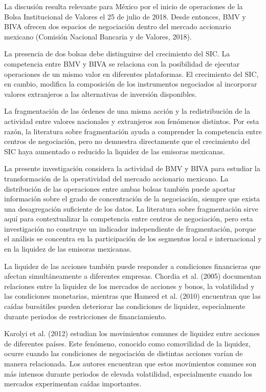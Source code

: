 La discusión resulta relevante para México por el inicio de operaciones de la Bolsa Institucional de Valores el 25 de julio de 2018. Desde entonces, BMV y BIVA ofrecen dos espacios de negociación dentro del mercado accionario mexicano (Comisión Nacional Bancaria y de Valores, 2018).

La presencia de dos bolsas debe distinguirse del crecimiento del SIC. La competencia entre BMV y BIVA se relaciona con la posibilidad de ejecutar operaciones de un mismo valor en diferentes plataformas. El crecimiento del SIC, en cambio, modifica la composición de los instrumentos negociados al incorporar valores extranjeros a las alternativas de inversión disponibles.

La fragmentación de las órdenes de una misma acción y la redistribución de la actividad entre valores nacionales y extranjeros son fenómenos distintos. Por esta razón, la literatura sobre fragmentación ayuda a comprender la competencia entre centros de negociación, pero no demuestra directamente que el crecimiento del SIC haya aumentado o reducido la liquidez de las emisoras mexicanas.

La presente investigación considera la actividad de BMV y BIVA para estudiar la transformación de la operatividad del mercado accionario mexicano. La distribución de las operaciones entre ambas bolsas también puede aportar información sobre el grado de concentración de la negociación, siempre que exista una desagregación suficiente de los datos. La literatura sobre fragmentación sirve aquí para contextualizar la competencia entre centros de negociación, pero esta investigación no construye un indicador independiente de fragmentación, porque el análisis se concentra en la participación de los segmentos local e internacional y en la liquidez de las emisoras mexicanas.


La liquidez de las acciones también puede responder a condiciones financieras que afectan simultáneamente a diferentes empresas. Chordia et al. (2005) documentan relaciones entre la liquidez de los mercados de acciones y bonos, la volatilidad y las condiciones monetarias, mientras que Hameed et al. (2010) encuentran que las caídas bursátiles pueden deteriorar las condiciones de liquidez, especialmente durante periodos de restricciones de financiamiento.

Karolyi et al. (2012) estudian los movimientos comunes de liquidez entre acciones de diferentes países. Este fenómeno, conocido como comovilidad de la liquidez, ocurre cuando las condiciones de negociación de distintas acciones varían de manera relacionada. Los autores encuentran que estos movimientos comunes son más intensos durante periodos de elevada volatilidad, especialmente cuando los mercados experimentan caídas importantes.

